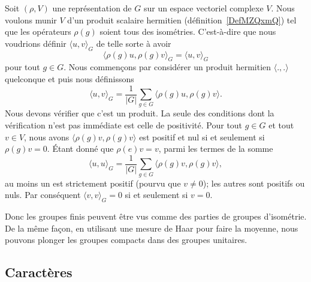 Soit \( (\rho,V)\) une représentation de \( G\) sur un espace vectoriel complexe \( V\). Nous voulons munir \( V\) d'un produit scalaire hermitien (définition~\ref{DefMZQxmQ}) tel que les opérateurs \( \rho(g)\) soient tous des isométries. C'est-à-dire que nous voudrions définir \( \langle u, v\rangle_G\) de telle sorte à avoir
\begin{equation}
	\langle \rho(g)u, \rho(g)v\rangle_G =\langle u, v\rangle_G
\end{equation}
pour tout \( g\in G\). Nous commençons par considérer un produit hermitien \( \langle ., .\rangle \) quelconque et puis nous définissons
\begin{equation}
	\langle u, v\rangle_G=\frac{1}{ | G | }\sum_{g\in G}\langle \rho(g)u, \rho(g)v\rangle.
\end{equation}
Nous devons vérifier que c'est un produit. La seule des conditions dont la vérification n'est pas immédiate est celle de positivité. Pour tout \( g\in G\) et tout \( v\in V\), nous avons \( \langle \rho(g)v, \rho(g)v\rangle \) est positif et nul si et seulement si \( \rho(g)v=0\). Étant donné que \( \rho(e)v=v\), parmi les termes de la somme
\begin{equation}
	\langle u, u\rangle_G=\frac{1}{ | G | }\sum_{g\in G}\langle \rho(g)v, \rho(g)v\rangle,
\end{equation}
au moins un est strictement positif (pourvu que \( v\neq 0\)); les autres sont positifs ou nuls. Par conséquent \( \langle v, v\rangle_G=0\) si et seulement si \( v=0\).

Donc les groupes finis peuvent être vus comme des parties de groupes d'isométrie. De la même façon, en utilisant une mesure de Haar pour faire la moyenne, nous pouvons plonger les groupes compacts dans des groupes unitaires.

\subsection{Caractères}

